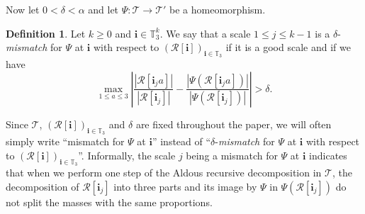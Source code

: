 \documentclass[JEP,XML,SOM,Unicode,NoFloatCountersInSection,published]{cedram}
\newcommand{\Tt}{\mathcal{T}}
\newcommand{\Rr}{\mathcal{R}}
\newcommand{\ii}{\mathbf{i}}
\theoremstyle{plain}
\theoremstyle{definition}
\newtheorem{definition}[theorem]{Definition}
\begin{document}
Now let $0<\delta<\alpha$ and let $\Psi: \Tt \to \Tt'$ be a homeomorphism.
\begin{definition}\label{defn_mismatch}
Let $k \geq 0$ and $\ii \in \mathbb{T}_3^k$. We say that a scale $1 \leq j \leq k-1$ is a $\delta$-\emph{mismatch} for $\Psi$ at $\ii$ with respect to $\left( \Rr[\ii] \right)_{\ii \in \mathbb{T}_3}$ if it is a good scale and if we have
\[ \max_{1 \leq a \leq 3} \left| \frac{\left| \Rr[\ii_j a] \right|}{\left| \Rr[\ii_j] \right|}-\frac{\left| \Psi \left( \Rr[\ii_j a] \right) \right|}{\left| \Psi \left( \Rr[\ii_j] \right) \right|} \right|>\delta. \]
\end{definition}
Since $\Tt$, $(\Rr[\ii])_{\ii \in \mathbb{T}_3}$ and $\delta$ are fixed throughout the paper, we will often simply write ``mismatch for $\Psi$ at $\ii$'' instead of ``$\delta$-\emph{mismatch} for $\Psi$ at $\ii$ with respect to $\left( \Rr[\ii] \right)_{\ii \in \mathbb{T}_3}$''.
Informally, the scale $j$ being a mismatch for $\Psi$ at $\ii$ indicates that when we perform one step of the Aldous recursive decomposition in $\Tt$, the decomposition of $\Rr[\ii_j]$ into three parts and its image by $\Psi$ in $\Psi \left( \Rr[\ii_j] \right)$ do not split the masses with the same proportions.
\end{document}

